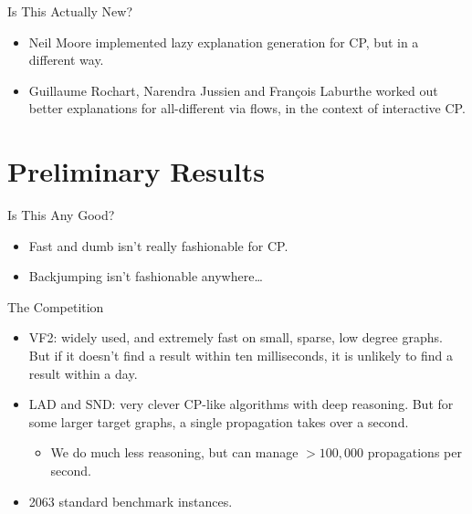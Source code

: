 \documentclass{beamer}
\begin{document}
\begin{frame}{Is This Actually New?}
    \begin{itemize}
        \item Neil Moore implemented lazy explanation generation for CP, but in a different way.

        \item Guillaume Rochart, Narendra Jussien and François Laburthe worked out better
            explanations for all-different via flows, in the context of interactive CP.
    \end{itemize}
\end{frame}

\section{Preliminary Results}

\begin{frame}{Is This Any Good?}
    \begin{itemize}
        \item Fast and dumb isn't really fashionable for CP.

        \item Backjumping isn't fashionable anywhere\ldots
    \end{itemize}
\end{frame}

\begin{frame}{The Competition}
    \begin{itemize}
        \item VF2: widely used, and extremely fast on small, sparse, low degree graphs. But if
            it doesn't find a result within ten milliseconds, it is unlikely to find a result
            within a day.

        \item LAD and SND: very clever CP-like algorithms with deep reasoning. But for some
            larger target graphs, a single propagation takes over a second.
            \begin{itemize}
                \item We do much less reasoning, but can manage $>100,000$ propagations per second.
            \end{itemize}

        \item 2063 standard benchmark instances.
    \end{itemize}
\end{frame}
\end{document}
